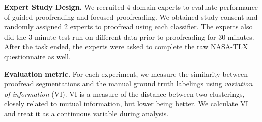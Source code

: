 \textbf{Expert Study Design.} We recruited 4 domain experts to evaluate performance of guided proofreading and focused proofreading. We obtained study consent and randomly assigned 2 experts to proofread using each classifier. The experts also did the 3 minute test run on different data prior to proofreading for 30 minutes. After the task ended, the experts were asked to complete the raw NASA-TLX questionnaire as well.

\textbf{Evaluation metric.} For each experiment, we measure the similarity between proofread segmentations and the manual ground truth labelings using \textit{variation of information} (VI). VI is a measure of the distance between two clusterings, closely related to mutual information, but lower being better. We calculate VI and treat it as a continuous variable during analysis.



%


